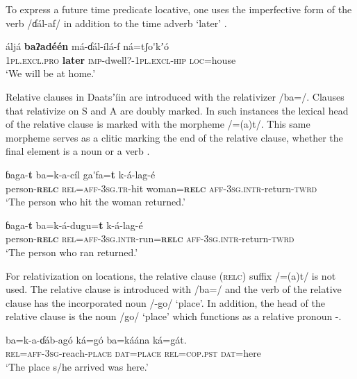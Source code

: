 \documentclass[output=paper]{langsci/langscibook}
\begin{document}
To express a future time predicate locative, one uses the imperfective form of the verb /ɗ\'{a}l-af/ in addition to the time adverb ‘later’ .

\ea\label{ex:ahlandc:81}
\gll
\'{a}lj\'{a}    \textbf{baʔad\'{e}\'{e}n}   m\'{a}-ɗ\'{a}l-\'{i}l\'{a}-f                   n\'{a}=tʃo\'{ }kʼ\'{o} \\
\textsc{1pl.excl.pro}   \textbf{later}  \textsc{imp}{}-dwell?-\textsc{1pl.excl-hip} \textsc{loc}=house\\
\glt
‘We will be at home.’
\z

Relative clauses in Daatsʼ\'{i}in are introduced with the relativizer /ba=/. Clauses that relativize on S and A are doubly marked. In such instances the lexical head of the relative clause is marked with the morpheme /=(a)t/. This same morpheme serves as a clitic marking the end of the relative clause, whether the final element is a noun  or a verb . 

\ea\label{ex:ahlandc:82}
\gll
ɓaga-\textbf{t}    ba=k-a-c\'{i}l    ga\'{ }fa=\textbf{t}  k-\'{a}-lag-\'{e} \\
person-\textbf{\textsc{relc}} \textsc{    rel=aff-3sg.tr}{}-hit  woman=\textbf{\textsc{relc}} \textsc{aff-3sg.intr}{}-return-\textsc{twrd}\\
\glt
‘The person who hit the woman returned.’
\z

\ea\label{ex:ahlandc:83}
\gll
ɓaga-\textbf{t}    ba=k-\'{a}-dugu=\textbf{t}    k-\'{a}-lag-\'{e}  \\
person-\textbf{\textsc{relc}} \textsc{    rel=aff-3sg.intr}{}-run=\textbf{\textsc{relc}} \textsc{aff-3sg.intr}{}-return-\textsc{twrd}\\
\glt
‘The person who ran returned.’
\z

For relativization on locations, the relative clause (\textsc{relc}) suffix /=(a)t/ is not used. The relative clause is introduced with /ba=/ and the verb of the relative clause has the incorporated noun /-go/ ‘place’.  In addition, the head of the relative clause is the noun /go/ ‘place’ which functions as a relative pronoun -.

\ea\label{ex:ahlandc:84}
\gll
ba=k-a-ɗ\'{a}b-ag\'{o}  k\'{a}=g\'{o}  ba=k\'{a}\'{a}na  k\'{a}=g\'{a}t. \\
\textsc{rel}\textsc{=aff-3sg}{}-reach-\textsc{place  dat}\textsc{=place}   \textsc{rel=cop.pst}  \textsc{dat}=here\\
\glt
 ‘The place s/he arrived was here.’
\z
\end{document}
